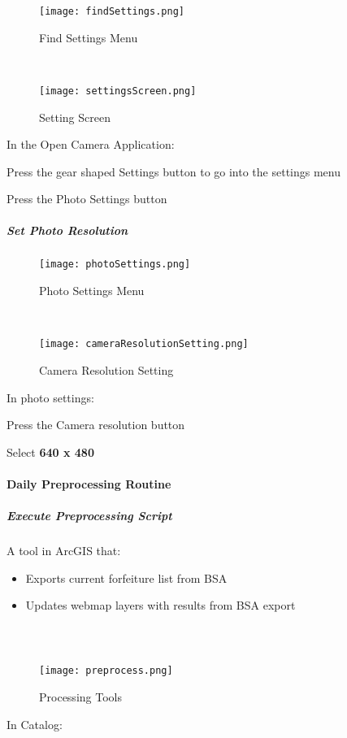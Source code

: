 \documentclass[class=book , crop=false, titlepage, twoside, multi={itemize, figure, verbatim}, float=false]{standalone}
\begin{document}
%
%





\begin{wrapfigure}{r}{0.5\textwidth}
\centering
\texttt{[image: findSettings.png]}
\caption{Find Settings Menu}
\vspace{.25in}

\HRule \\[.4cm] %
\vspace{.25in}

\texttt{[image: settingsScreen.png]}
\caption{Setting Screen}
\end{wrapfigure}
In the Open Camera Application:
\vspace{1in}

\noindent Press the gear shaped \Large Settings \normalsize button to go into the settings menu
\vspace{3in}

\noindent Press the \Large Photo Settings \normalsize button
\clearpage
%
%
%
\subparagraph*{Set Photo Resolution}
%
%
\begin{wrapfigure}{r}{0.5\textwidth}
\centering
\texttt{[image: photoSettings.png]}
\caption{Photo Settings Menu}
\vspace{.25in}

\HRule \\[.4cm] %
\vspace{.25in}

\texttt{[image: cameraResolutionSetting.png]}
\caption{Camera Resolution Setting}
\end{wrapfigure}
In \Large photo settings:
\vspace{1in}

\noindent Press the \Large Camera resolution \normalsize button
\vspace{3in}

\noindent Select \textbf{\LARGE 640 x 480}
\clearpage
%
%
%
\paragraph{Daily Preprocessing Routine}
\subparagraph{Execute Preprocessing Script}A tool in ArcGIS that:
\begin{itemize}
\item Exports current forfeiture list from BSA
\item Updates webmap layers with results from BSA export
\end{itemize}
\subparagraph*{\\}
%
%
\begin{wrapfigure}{r}{0.75\textwidth}
\centering
\texttt{[image: preprocess.png]}
\caption{Processing Tools}
\end{wrapfigure}
In Catalog:
\vspace{1in}
\end{document}

